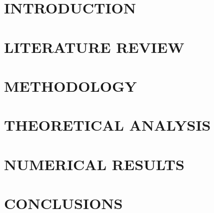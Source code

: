 \documentclass[a4paper,13pt,3p,twoside]{report}
\theoremstyle{definition}
\begin{document}
\glsaddall
\renewcommand*{\acronymname}{LIST OF ABBREVIATIONS}
\renewcommand*{\entryname}{Abbreviation}
\renewcommand*{\descriptionname}{Definition}
\printnoidxglossaries

\renewcommand\appendixname{APPENDIX}
\renewcommand\appendixpagename{APPENDIX}
\renewcommand\appendixtocname{APPENDIX}

\renewcommand{\figurename}{Figure}
\renewcommand{\tablename}{Table}
\renewcommand{\chaptername}{CHAPTER}


\newpage
{}

\pagestyle{fancy}
\fancyhf{}
\fancyhead[RE, LO]{\leftmark}
\fancyfoot[RE, LO]{\thepage}

\chapter{INTRODUCTION}

\newpage
\chapter{LITERATURE REVIEW}


\newpage
\chapter{METHODOLOGY}


\newpage
\chapter{THEORETICAL ANALYSIS}


\newpage
\chapter{NUMERICAL RESULTS}


\newpage
\chapter{CONCLUSIONS}

\end{document}
